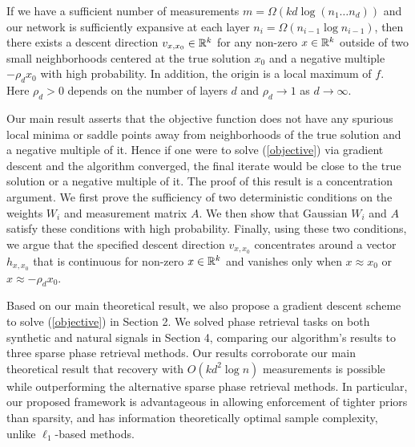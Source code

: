 \documentclass{article}
\begin{document}
\begin{thm}[Informal]
If we have a sufficient number of measurements $m = \Omega(kd \log(n_1\dots n_d))$ and our network is sufficiently expansive at each layer $n_i = \Omega(n_{i-1}\log n_{i-1})$, then there exists a descent direction $v_{x,x_0} \in \mathbb{R}^k$ for any non-zero $x \in \mathbb{R}^k$ outside of two small  neighborhoods centered at the true solution $x_0$ and a negative multiple $-\rho_d x_0$ with high probability. In addition, the origin is a local maximum of $f$. Here $\rho_d > 0$ depends on the number of layers $d$ and $\rho_d \rightarrow 1$ as $d \rightarrow \infty$.
\end{thm}

Our main result asserts that the objective function does not have any spurious local minima or saddle points away from neighborhoods of the true solution and a negative multiple of it. Hence if one were to solve (\ref{objective}) via gradient descent and the algorithm converged, the final iterate would be close to the true solution or a negative multiple of it. The proof of this result is a concentration argument. We first prove the sufficiency of two deterministic conditions on the weights $W_i$ and measurement matrix $A$. We then show that Gaussian $W_i$ and $A$ satisfy these conditions with high probability. Finally, using these two conditions, we argue that the specified descent direction $v_{x,x_0}$ concentrates around a vector $h_{x,x_0}$ that is continuous for non-zero $x \in \mathbb{R}^k$ and vanishes only when $x \approx x_0$ or $x \approx -\rho_d x_0$.

Based on our main theoretical result, we also propose a gradient descent scheme to solve (\ref{objective}) in Section 2. We solved phase retrieval tasks on both synthetic and natural signals in Section 4, comparing our algorithm's results to three sparse phase retrieval methods. Our results corroborate our main theoretical result that recovery with $O(k d^2 \log n)$ measurements is possible while outperforming the alternative sparse phase retrieval methods. In particular, our proposed framework is advantageous in allowing enforcement of tighter priors than sparsity, and has information theoretically optimal sample complexity, unlike $\ell_1$-based methods.

\end{document}
